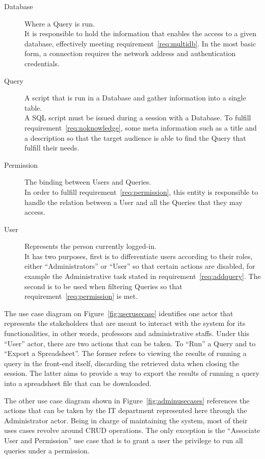 \begin{description}
\item[Database] Where a Query is run.\\
  It is responsible to hold the information that enables the access to a given database, effectively meeting requirement~\ref{req:multidb}.
  In the most basic form, a connection requires the network address and authentication credentials.
\item[Query] A script that is run in a Database and gather information into a single table.\\
  A \gls{SQL} script must be issued during a session with a Database.
  To fulfill requirement~\ref{req:noknowledge}, some meta information such as a title and a description so that the target audience is able to find the Query that fulfill their needs.
\item[Permission] The binding between Users and Queries.\\
  In order to fulfill requirement~\ref{req:permission}, this entity is responsible to handle the relation between a User and all the Queries that they may access.
\item[User] Represents the person currently logged-in.\\
  It has two purposes, first is to differentiate users according to their roles, either ``Administrators'' or ``User'' so that certain actions are disabled, for example the Administrative task stated in requirement~\ref{req:addquery}.
  The second is to be used when filtering Queries so that requirement~\ref{req:permission} is met.
\end{description}

The use case diagram on Figure~\ref{fig:userusecase} identifies one actor that represents the stakeholders that are meant to interact with the system for its functionalities, in other words,  professors and administrative staffs. Under this ``User'' actor, there are two actions that can be taken. To ``Run'' a Query and to ``Export a Spreadsheet''. The former refers to viewing the results of running a query in the front-end itself, discarding the retrieved data when closing the session. The latter aims to provide a way to export the results of running a query into a spreadsheet file that can be downloaded.

The other use case diagram shown in Figure~\ref{fig:adminusecases} references the actions that can be taken by the \gls{IT} department represented here through the Administrator actor. Being in charge of maintaining the system, most of their uses cases revolve around \gls{CRUD} operations. The only exception is the ``Associate User and Permission'' use case that is to grant a user the privilege to run all queries under a permission.

